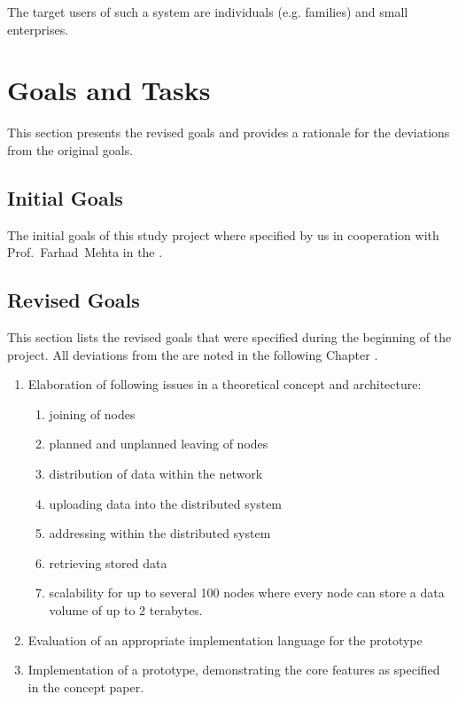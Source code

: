 The target users of such a system are individuals (e.g. families) and small enterprises.

\section{Goals and Tasks}
This section presents the revised goals and provides a rationale for the deviations from the original goals.

\subsection{Initial Goals}
The initial goals of this study project where specified by us in cooperation with Prof.~Farhad~Mehta in the .

\subsection{Revised Goals}
This section lists the revised goals that were specified during the beginning of the project. All deviations from the  are noted in the following Chapter .

\begin{enumerate}
    \item Elaboration of following issues in a theoretical concept and architecture:
        \begin{enumerate}
            \item joining of nodes
            \item planned and unplanned leaving of nodes
            \item distribution of data within the network
            \item uploading data into the distributed system
            \item addressing within the distributed system
            \item retrieving stored data
            \item scalability for up to several 100 nodes where every node can store a data volume of up to 2 terabytes.
        \end{enumerate}
    \item Evaluation of an appropriate implementation language for the prototype
    \item Implementation of a prototype, demonstrating the core features as specified in the concept paper.
\end{enumerate}

